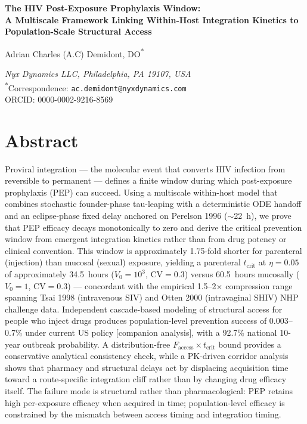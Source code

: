 \documentclass[10pt,letterpaper]{article}
\theoremstyle{definition}
\theoremstyle{remark}
\newcommand{\Faccess}{F_{\text{access}}}
\newcommand{\tcrit}{t_{\text{crit}}}
\begin{document}
\linenumbers
\vspace*{0.2in}

\begin{flushleft}

{\LARGE\bfseries The HIV Post-Exposure Prophylaxis Window:\\[0.3em]
A Multiscale Framework Linking Within-Host Integration Kinetics to Population-Scale Structural Access\par}
\vspace{1em}

{\large Adrian Charles (A.C) Demidont, DO\textsuperscript{*}\par}
\vspace{0.5em}
\textit{Nyx Dynamics LLC, Philadelphia, PA 19107, USA}\\[0.3em]
\textsuperscript{*}Correspondence: \texttt{ac.demidont@nyxdynamics.com} \\
ORCID: 0000-0002-9216-8569
\end{flushleft}
\section*{Abstract}
Proviral integration --- the molecular event that converts HIV infection from reversible to permanent --- defines a finite window during which post-exposure prophylaxis (PEP) can succeed. Using a multiscale within-host model that combines stochastic founder-phase tau-leaping with a deterministic ODE handoff and an eclipse-phase fixed delay anchored on Perelson 1996 ($\sim$22~h), we prove that PEP efficacy decays monotonically to zero and derive the critical prevention window from emergent integration kinetics rather than from drug potency or clinical convention. This window is approximately 1.75-fold shorter for parenteral (injection) than mucosal (sexual) exposure, yielding a parenteral $\tcrit$ at $\eta = 0.05$ of approximately 34.5~hours ($V_{0} = 10^{3}$, CV$=0.3$) versus 60.5~hours mucosally ($V_{0} = 1$, CV$=0.3$) --- concordant with the empirical 1.5--2$\times$ compression range spanning Tsai 1998 (intravenous SIV) and Otten 2000 (intravaginal SHIV) NHP challenge data. Independent cascade-based modeling of structural access for people who inject drugs produces population-level prevention success of 0.003--0.7\% under current US policy [companion analysis], with a 92.7\% national 10-year outbreak probability. A distribution-free $\Faccess \times \tcrit$ bound provides a conservative analytical consistency check, while a PK-driven corridor analysis shows that pharmacy and structural delays act by displacing acquisition time toward a route-specific integration cliff rather than by changing drug efficacy itself. The failure mode is structural rather than pharmacological: PEP retains high per-exposure efficacy when acquired in time; population-level efficacy is constrained by the mismatch between access timing and integration timing.
\end{document}

